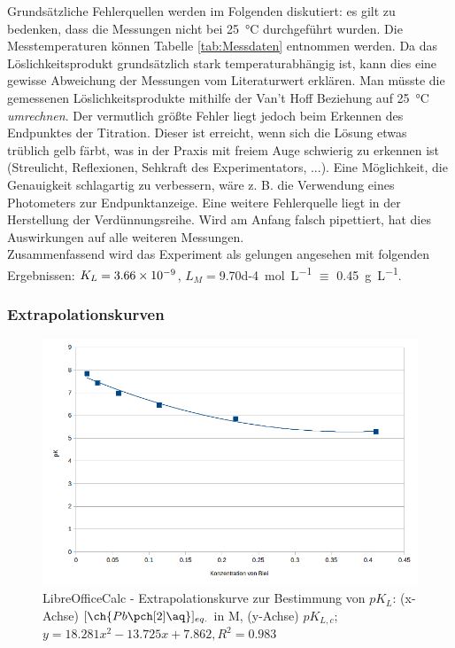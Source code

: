 \documentclass{article}
\begin{document}
    Grundsätzliche Fehlerquellen werden im Folgenden diskutiert: es gilt zu bedenken, dass die Messungen nicht bei \SI[mode=text]{25}{\degreeCelsius} durchgeführt wurden. Die Messtemperaturen können Tabelle \ref{tab:Messdaten} entnommen werden. Da das Löslichkeitsprodukt grundsätzlich stark temperaturabhängig ist, kann dies eine gewisse Abweichung der Messungen vom Literaturwert erklären. Man müsste die gemessenen Löslichkeitsprodukte mithilfe der Van't Hoff Beziehung auf \SI[mode=text]{25}{\degreeCelsius} \textit{umrechnen}. Der vermutlich größte Fehler liegt jedoch beim Erkennen des Endpunktes der Titration. Dieser ist erreicht, wenn sich die Lösung etwas trüblich gelb färbt, was in der Praxis mit freiem Auge schwierig zu erkennen ist (Streulicht, Reflexionen, Sehkraft des Experimentators, ...). Eine Möglichkeit, die Genauigkeit schlagartig zu verbessern, wäre z. B. die Verwendung eines Photometers zur Endpunktanzeige. Eine weitere Fehlerquelle liegt in der Herstellung der Verdünnungsreihe. Wird am Anfang falsch pipettiert, hat dies Auswirkungen auf alle weiteren Messungen.\\
    
    Zusammenfassend wird das Experiment als gelungen angesehen mit folgenden Ergebnissen: $K_{L}=\num{3.66d-9}$, $L_{M} = $\SI[mode=text, separate-uncertainty]{9.70d-4}{\mole\per\liter} $\equiv$ \SI[mode=text, separate-uncertainty]{0.45}{\gram\per\liter}. 
    
    \subsubsection{Extrapolationskurven}
    
    \begin{figure}[H]
      \includegraphics[scale=0.6, center]{Graphiken/Auswertung/Extrapolation.png} 
      \caption[Extrapolationskurve zur Bestimmung von $pK_{L}$ mit LibreOfficeCalc, Quelle: Autor]{LibreOfficeCalc - Extrapolationskurve zur Bestimmung von $pK_{L}$: (x-Achse) $[\ch{Pb\pch[2]\aq}]_{eq.}$ in M, (y-Achse) $pK_{L,c}$; $y=18.281x^2-13.725x+7.862,R^2=0.983$}
      \label{fig:Extrapolation}
    \end{figure}
    
\end{document}
